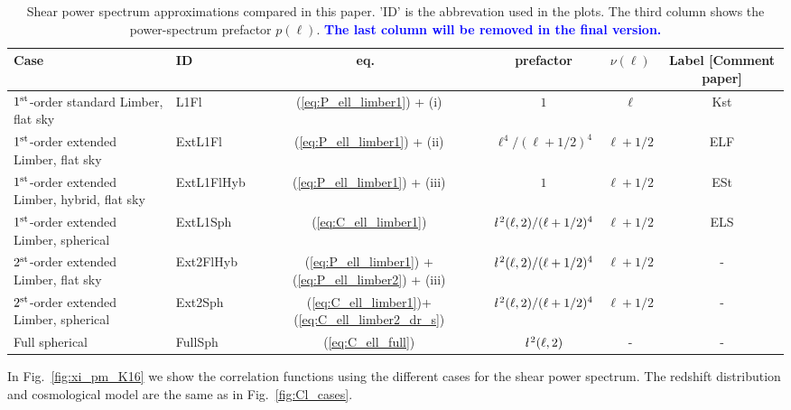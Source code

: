 \documentclass[fleqn,usenatbib]{mnras} %
\newcommand{\ellbar}{\hbox{\it \l}\,}
\newcommand{\mk}[1]{{\bf\textcolor{blue}{#1}}}
\begin{document}
\renewcommand{\baselinestretch}{1.3}
\begin{table}

  \label{tab:cases}

  \caption{Shear power spectrum approximations compared in this paper. 'ID' is the abbrevation used in the plots.
    The third column shows the power-spectrum prefactor $p(\ell)$.  \mk{The last column will be removed in the
        final version.}}

  \begin{tabular}{|l|l|c|c|c|c}
  \hline
  Case & ID & eq.~ & prefactor & $\nu(\ell)$ & Label [Comment paper] \\ \hline
  $1^{\rm st}$-order standard Limber, flat sky & L1Fl & (\ref{eq:P_ell_limber1}) + (i)
    & $1$ & $\ell$ & Kst \\ \hline
  $1^{\rm st}$-order extended Limber, flat sky & ExtL1Fl & (\ref{eq:P_ell_limber1}) + (ii)
    & $\ell^4/(\ell+1/2)^4$ & $\ell + 1/2$ & ELF \\ \hline
  $1^{\rm st}$-order extended Limber, hybrid, flat sky & ExtL1FlHyb & (\ref{eq:P_ell_limber1}) + (iii)
    & $1$ & $\ell + 1/2$ & ESt \\ \hline
  $1^{\rm st}$-order extended Limber, spherical & ExtL1Sph & (\ref{eq:C_ell_limber1})
    & $\ellbar^2(\ell, 2)/(\ell+1/2)^4$ & $\ell+1/2$ & ELS \\ \hline
  $2^{\rm st}$-order extended Limber, flat sky & Ext2FlHyb &  (\ref{eq:P_ell_limber1}) + (\ref{eq:P_ell_limber2}) + (iii)
    & $\ellbar^2(\ell, 2)/(\ell+1/2)^4$ & $\ell+1/2$ & - \\ \hline
  $2^{\rm st}$-order extended Limber, spherical & Ext2Sph & (\ref{eq:C_ell_limber1})+(\ref{eq:C_ell_limber2_dr_s})
    & $\ellbar^2(\ell, 2)/(\ell+1/2)^4$ & $\ell+1/2$ & - \\ \hline
  Full spherical & FullSph & (\ref{eq:C_ell_full}) &
      $\ellbar^2(\ell, 2)$ & - & - \\ \hline
  \end{tabular}

\end{table}
\renewcommand{\baselinestretch}{1}

In Fig.~\ref{fig:xi_pm_K16} we show the correlation functions using the different cases
for the shear power spectrum. The redshift distribution and cosmological model are the same 
as in Fig.~\ref{fig:Cl_cases}.
\end{document}
